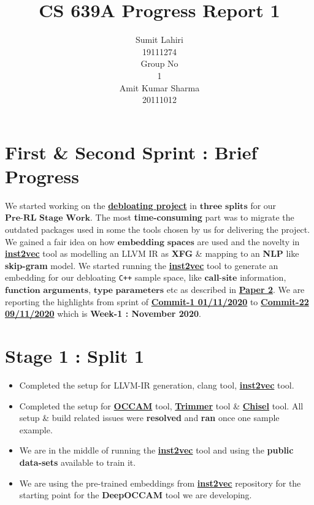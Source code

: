 \documentclass{article} %
\title{CS 639A Progress Report 1}
\author{
Sumit Lahiri \\
19111274 \\
\And
Group No\\
1\\
\And
Amit Kumar Sharma \\
20111012\\
}
\begin{document}
\maketitle

\section*{First \& Second Sprint : Brief Progress}
We started working on the \textbf{\href{https://github.com/lahiri-phdworks/reinforcedlearning-debloater}{debloating project}} in $\textbf{three splits}$ for our $\textbf{Pre-RL Stage Work}$. The most \textbf{time-consuming} part was to migrate the outdated packages used in some the tools chosen by us for delivering the project. We gained a fair idea on how $\textbf{embedding spaces}$ are used and the novelty in \textbf{\href{https://github.com/lahiri-phdworks/ncc}{inst2vec}} tool as modelling an LLVM IR as \textbf{XFG} \& mapping to an \textbf{NLP} like \textbf{skip-gram} model. We started running the \textbf{\href{https://github.com/lahiri-phdworks/ncc}{inst2vec}} tool to generate an embedding for our debloating \texttt{C++} sample space, like $\textbf{call-site}$ information, $\textbf{function arguments}$, $\textbf{type parameters}$ etc as described in \textbf{\href{http://www.csl.sri.com/users/gehani/papers/MLSys-2019.DeepOCCAM.pdf}{Paper 2}}. We are reporting the highlights from sprint of \textbf{\href{https://github.com/lahiri-phdworks/reinforcedlearning-debloater/commit/dd63911895cb31cdc77c9debd57090422ffb3b65}{Commit-1 01/11/2020}} to 
\textbf{\href{https://github.com/lahiri-phdworks/reinforcedlearning-debloater/commit/8066e7b7b7fa7513e3611e3f3aee6fb72c81ea83}{Commit-22 09/11/2020}} which is \textbf{Week-1 : November 2020}.

\section*{Stage 1 : Split 1} 
\begin{itemize}
    \item Completed the setup for LLVM-IR generation, clang tool, \textbf{\href{https://github.com/lahiri-phdworks/ncc}{inst2vec}} tool. 
    \item Completed the setup for \textbf{\href{https://github.com/ashish-gehani/OCCAM}{OCCAM}} tool, \textbf{\href{http://www.csl.sri.com/users/gehani/papers/ASE-2018.Trimmer.pdf}{Trimmer}} tool \& \textbf{\href{https://github.com/aspire-project/chisel}{Chisel}} tool. All setup \& build related issues were \textbf{\color{red}resolved} and \textbf{\color{red}ran} once one sample example.
	\item We are in the middle of running the \textbf{\href{https://github.com/lahiri-phdworks/ncc}{inst2vec}} tool and using the \textbf{public data-sets} available to train it. 
	\item We are using the pre-trained embeddings from \textbf{\href{https://github.com/lahiri-phdworks/ncc}{inst2vec}} repository for the starting point for the \textbf{DeepOCCAM} tool we are developing.
\end{itemize}
\end{document}
